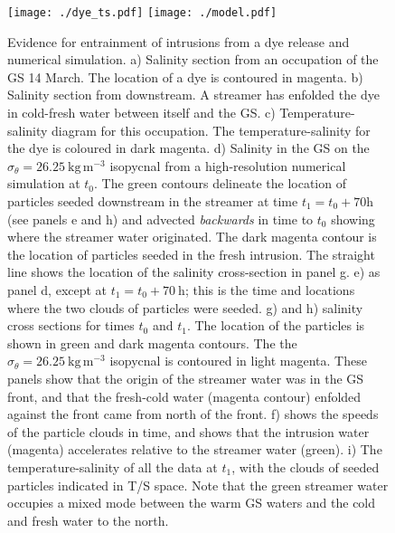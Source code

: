 \documentclass[draft,grl]{agutex2015}
\providecommand{\DIFadd}[1]{{\protect\color{blue}\uwave{#1}}} %
\providecommand{\DIFaddFL}[1]{\DIFadd{#1}} %
\providecommand{\DIFaddbeginFL}{} %
\providecommand{\DIFaddendFL}{} %
\begin{document}
\begin{article}
\begin{figure}[htbp]
  \centering
    \DIFaddendFL \texttt{[image: ./dye\_ts.pdf]}
    \texttt{[image: ./model.pdf]}
  \caption{Evidence for entrainment of intrusions from a dye release and numerical simulation.
a) Salinity section from an occupation of the GS 14 March. The location of a dye is contoured in magenta.  b) Salinity section from downstream.  A streamer has enfolded the dye in cold-fresh water between itself and the GS.  c) Temperature-salinity diagram for this occupation.  The temperature-salinity for the dye is coloured in dark magenta.  
d) Salinity in the GS on the $\sigma_{\theta}=26.25\  \mathrm{kg\,m^{-3}}$ isopycnal from a high-resolution numerical simulation at $t_0$.  The green contours delineate the location of particles seeded downstream in the streamer at time $t_1=t_0+70 \mathrm{h}$ (see panels e and h) and advected \emph{backwards} in time to $t_0$ showing where the streamer water originated. The dark magenta contour is the location of particles seeded in the fresh intrusion.  The straight line shows the location of the salinity cross-section in panel g.  e) as panel d, except at $t_1=t_0+70\ \mathrm{h}$; this is the time and locations where the two clouds of particles were seeded.  g) and h) salinity cross sections for times $t_0$ and $t_1$.  The location of the particles is shown in green and dark magenta contours.  The the $\sigma_{\theta}=26.25\  \mathrm{kg\,m^{-3}}$ isopycnal is contoured in light magenta.  These panels show that the origin of the streamer water was in the GS front, and that the fresh-cold water (magenta contour) enfolded against the front came from north of the front.  f) shows the speeds \DIFaddbeginFL \DIFaddFL{(min/max is shaded, and mean is the line) }\DIFaddendFL of the particle clouds in time, and shows that the intrusion water (magenta) accelerates relative to the streamer water (green).  i) The temperature-salinity of all the data at $t_1$, with the clouds of seeded particles indicated in T/S space.  Note that the green streamer water occupies a  mixed mode between the warm GS waters and the cold and fresh water to the north.  
  } \label{fig:StreamersModel}
\end{figure}





\end{article}
\end{document}
